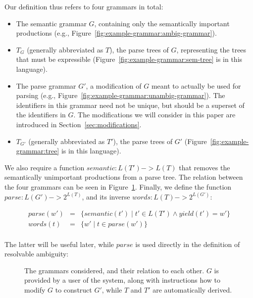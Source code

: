 \documentclass[sigplan]{acmart}\settopmatter{printfolios=true,printccs=false,printacmref=false}
\newcommand{\yield}{\mathit{yield}} %
\newcommand{\semantic}{\mathit{semantic}} %
\newcommand{\parse}{\mathit{parse}} %
\newcommand{\words}{\mathit{words}} %
\begin{document}
Our definition thus refers to four grammars in total:

\begin{itemize}
  \item The semantic grammar $G$, containing only the semantically important productions (e.g., Figure~\ref{fig:example-grammar:ambig-grammar}).
  \item $T_G$ (generally abbreviated as $T$), the parse trees of $G$, representing the trees that must be expressible (Figure~\ref{fig:example-grammar:sem-tree} is in this language).
  \item The parse grammar $G'$, a modification of $G$ meant to actually be used for parsing (e.g., Figure~\ref{fig:example-grammar:unambig-grammar}). The identifiers in this grammar need not be unique, but should be a superset of the identifiers in $G$. The modifications we will consider in this paper are introduced in Section~\ref{sec:modifications}.
  \item $T_{G'}$ (generally abbreviated as $T'$), the parse trees of $G'$ (Figure~\ref{fig:example-grammar:tree} is in this language).
\end{itemize}

\noindent We also require a function $\semantic : L(T') -> L(T)$ that removes the semantically unimportant productions from a parse tree. The relation between the four grammars can be seen in Figure~\ref{fig:grammar-square}. Finally, we define the function $\parse : L(G') -> 2^{L(T)}$, and its inverse $\words : L(T) -> 2^{L(G')}$:

$$
\begin{array}{rcl}
\parse(w') & = & \{ \semantic(t') \mid t' \in L(T') \land \yield(t') = w' \} \\
\words(t) & = & \{ w' \mid t \in \parse(w') \} \\
\end{array}
$$

\noindent The latter will be useful later, while $\parse$ is used directly in the definition of resolvable ambiguity:

\begin{figure}
  \caption{The grammars considered, and their relation to each other. $G$ is provided by a user of the system, along with instructions how to modify $G$ to construct $G'$, while $T$ and $T'$ are automatically derived.}
  \label{fig:grammar-square}
\end{figure}
\end{document}
